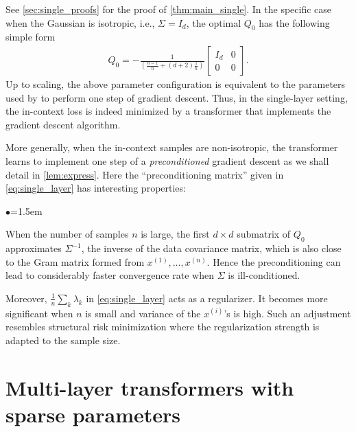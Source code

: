 \documentclass{article}
\newcommand{\tx}[1]{x^{(#1)}}
\begin{document}
See \autoref{sec:single_proofs} for the proof of \autoref{thm:main_single}. In the specific case when the Gaussian is isotropic, i.e., $\Sigma = I_d$, the optimal $Q_0$ has the following simple form 
\begin{align} \label{minimum:linear}
Q_0 = - \frac{1}{\left( \frac{n-1}{n} +  (d+2) \frac{1}{n} \right)}  \begin{bmatrix}I_d &0   \\ 0 &0\end{bmatrix}.
\end{align}
Up to scaling, the above parameter configuration is equivalent to the parameters used by \citet{von2022transformers} to perform one step of gradient descent. Thus, in the single-layer setting, the in-context loss is indeed minimized by a transformer that implements the gradient descent algorithm.

More generally, when the in-context samples are non-isotropic, the transformer learns to implement one step of a \emph{preconditioned} gradient descent as we shall detail in \autoref{lem:express}. Here the ``preconditioning matrix''  given in \eqref{eq:single_layer} has interesting properties:
\begin{list}{$\bullet$}{\leftmargin=1.5em}
\setlength{\itemsep}{1pt}
\item When the number of samples $n$ is large, the first $d\times d$ submatrix of $Q_0$ approximates $\Sigma^{-1}$, the inverse of the data covariance matrix, which is also close to the Gram matrix formed from $\tx{1},\ldots,\tx{n}$. Hence the preconditioning can lead to considerably faster convergence rate when $\Sigma$ is ill-conditioned.
\item Moreover, $\frac{1}{n} \sum_k \lambda_k$  in \eqref{eq:single_layer}  acts as a regularizer. It becomes more significant when $n$ is small and variance of the $\tx{i}$'s is high. Such an adjustment resembles structural risk minimization \citep{vapnik1999nature} where the regularization strength is adapted to the sample size.   
\end{list}

\section{Multi-layer transformers with sparse parameters}
\label{s:k_layer_Q}
\end{document}
